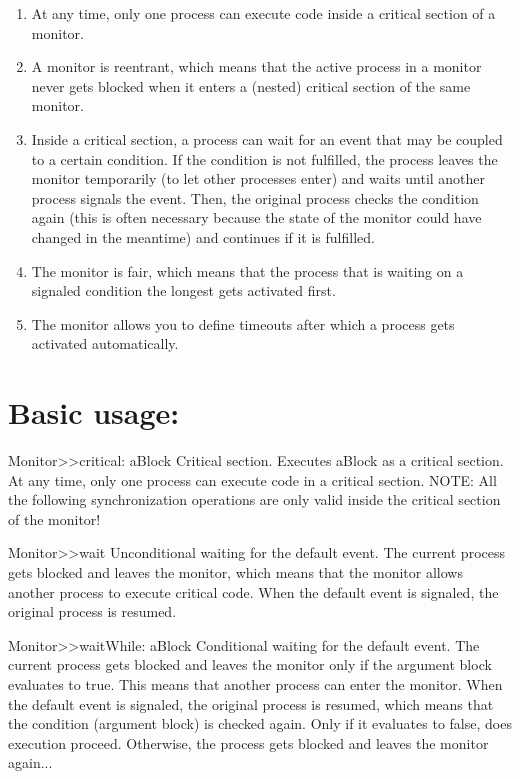 \documentclass[10pt,twoside,english]{_support/latex/sbabook/sbabook}
\begin{document}
\begin{enumerate}
\item At any time, only one process can execute code inside a critical section of a monitor.
\item A monitor is reentrant, which means that the active process in a monitor never gets blocked when it enters a (nested) critical section of the same monitor.
\item Inside a critical section, a process can wait for an event that may be coupled to a certain condition. If the condition is not fulfilled, the process leaves the monitor temporarily (to let other processes enter) and waits until another process signals the event. Then, the original process checks the condition again (this is often necessary because the state of the monitor could have changed in the meantime) and continues if it is fulfilled.
\item The monitor is fair, which means that the process that is waiting on a signaled condition the longest gets activated first.
\item The monitor allows you to define timeouts after which a process gets activated automatically.
\end{enumerate}
\section{Basic usage:}
Monitor\textgreater{}\textgreater{}critical: aBlock
Critical section.
Executes aBlock as a critical section. At any time, only one process can execute code in a critical section.
NOTE: All the following synchronization operations are only valid inside the critical section of the monitor!

Monitor\textgreater{}\textgreater{}wait
Unconditional waiting for the default event.
The current process gets blocked and leaves the monitor, which means that the monitor allows another process to execute critical code. When the default event is signaled, the original process is resumed.

Monitor\textgreater{}\textgreater{}waitWhile: aBlock
Conditional waiting for the default event.
The current process gets blocked and leaves the monitor only if the argument block evaluates to true. This means that another process can enter the monitor. When the default event is signaled, the original process is resumed, which means that the condition (argument block) is checked again. Only if it evaluates to false, does execution proceed. Otherwise, the process gets blocked and leaves the monitor again...
\end{document}
